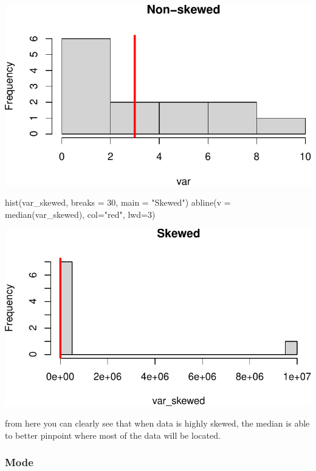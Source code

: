 \documentclass[
  letterpaper,
  DIV=11,
  numbers=noendperiod]{scrartcl}
\newenvironment{Shaded}{\begin{snugshade}}{\end{snugshade}}
\newcommand{\AttributeTok}[1]{\textcolor[rgb]{0.40,0.45,0.13}{#1}}
\newcommand{\DecValTok}[1]{\textcolor[rgb]{0.68,0.00,0.00}{#1}}
\newcommand{\FunctionTok}[1]{\textcolor[rgb]{0.28,0.35,0.67}{#1}}
\newcommand{\NormalTok}[1]{\textcolor[rgb]{0.00,0.23,0.31}{#1}}
\newcommand{\StringTok}[1]{\textcolor[rgb]{0.13,0.47,0.30}{#1}}
\begin{document}
\includegraphics{stats_review_files/figure-pdf/unnamed-chunk-7-1.pdf}

\begin{Shaded}
\begin{Highlighting}[]
\FunctionTok{hist}\NormalTok{(var\_skewed, }\AttributeTok{breaks =} \DecValTok{30}\NormalTok{, }\AttributeTok{main =} \StringTok{"Skewed"}\NormalTok{)}
\FunctionTok{abline}\NormalTok{(}\AttributeTok{v =} \FunctionTok{median}\NormalTok{(var\_skewed), }\AttributeTok{col=}\StringTok{"red"}\NormalTok{, }\AttributeTok{lwd=}\DecValTok{3}\NormalTok{)}
\end{Highlighting}
\end{Shaded}

\includegraphics{stats_review_files/figure-pdf/unnamed-chunk-8-1.pdf}

from here you can clearly see that when data is highly skewed, the
median is able to better pinpoint where most of the data will be
located.

\subsubsection{Mode}\label{mode}
\end{document}
